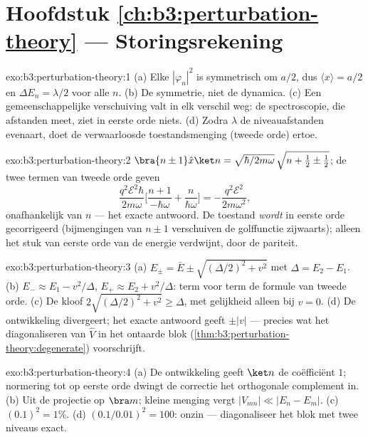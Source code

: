 \section*{Hoofdstuk \ref{ch:b3:perturbation-theory} --- Storingsrekening}

\begin{solution}{exo:b3:perturbation-theory:1}
(a) Elke $|\varphi_n|^2$ is symmetrisch om $a/2$, dus $\langle
x\rangle = a/2$ en $\Delta E_n = \lambda/2$ voor alle $n$. (b) De
symmetrie, niet de dynamica. (c) Een gemeenschappelijke verschuiving valt
in elk verschil weg: de spectroscopie, die afstanden meet, ziet in eerste
orde niets. (d) Zodra $\lambda$ de niveauafstanden evenaart, doet de
verwaarloosde toestandsmenging (tweede orde) ertoe.
\end{solution}

\begin{solution}{exo:b3:perturbation-theory:2}
$\bra{n\pm1}\hat x\ket n = \sqrt{\hbar/2m\omega}\,\sqrt{n + \tfrac12
\pm \tfrac12}$; de twee termen van tweede orde geven
\[
\frac{q^2\mathcal E^2\hbar}{2m\omega}\Big[\frac{n+1}{-\hbar\omega}
+ \frac{n}{\hbar\omega}\Big] = -\frac{q^2\mathcal E^2}{2m\omega^2} ,
\]
onafhankelijk van $n$ --- het exacte antwoord. De toestand \emph{wordt}
in eerste orde gecorrigeerd (bijmengingen van $n \pm 1$ verschuiven de
golffunctie zijwaarts); alleen het stuk van eerste orde van de energie
verdwijnt, door de pariteit.
\end{solution}

\begin{solution}{exo:b3:perturbation-theory:3}
(a) $E_\pm = \bar E \pm \sqrt{(\Delta/2)^2 + v^2}$ met $\Delta =
E_2 - E_1$. (b) $E_- \approx E_1 - v^2/\Delta$, $E_+ \approx E_2 +
v^2/\Delta$: term voor term de formule van tweede orde. (c) De kloof
$2\sqrt{(\Delta/2)^2 + v^2} \ge \Delta$, met gelijkheid alleen bij $v =
0$. (d) De ontwikkeling divergeert; het exacte antwoord geeft $\pm|v|$ ---
precies wat het diagonaliseren van $\hat V$ in het ontaarde blok
(\cref{thm:b3:perturbation-theory:degenerate}) voorschrijft.
\end{solution}

\begin{solution}{exo:b3:perturbation-theory:4}
(a) De ontwikkeling geeft $\ket n$ de coëfficiënt $1$; normering tot op
eerste orde dwingt de correctie het orthogonale complement in. (b) Uit de
projectie op $\bra m$; kleine menging vergt $|V_{mn}| \ll |E_n - E_m|$.
(c) $(0.1)^2 = 1\%$. (d) $(0.1/0.01)^2 = 100$: onzin --- diagonaliseer het
blok met twee niveaus exact.
\end{solution}

